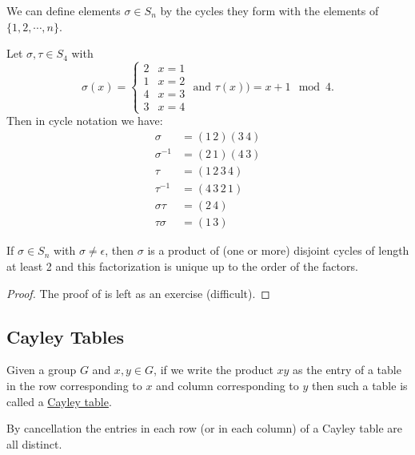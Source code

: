 \documentclass[11pt]{article}
\begin{document}
\begin{definition}
    We can define elements $\sigma\in S_n$ by the cycles they form with the elements of $\{1,2,\cdots,n\}$.
\end{definition}

\begin{example}
    Let $\sigma,\tau\in S_4$ with 
    \[\sigma(x)=\begin{cases}2&x=1\\1&x=2\\4&x=3\\3&x=4\end{cases}\text{ and }\tau(x))=x+1\mod{4}.\]
    Then in cycle notation we have:
    \begin{align*}
        \sigma&=(1\,2)(3\,4) \\
        \sigma^{-1}&=(2\,1)(4\,3) \\
        \tau&=(1\,2\,3\,4) \\
        \tau^{-1}&=(4\,3\,2\,1) \\
        \sigma\tau&=(2\,4) \\
        \tau\sigma&=(1\,3)
    \end{align*}
\end{example}

\begin{theorem}
    If $\sigma\in S_n$ with $\sigma\neq\epsilon$, then $\sigma$ is a product of (one or more) disjoint cycles of length at least 2 and this factorization is unique up to the order of the factors.
\end{theorem}

\begin{proof}
    The proof of  is left as an exercise (difficult).
\end{proof}

\subsection{Cayley Tables}

\begin{definition}
    Given a group $G$ and $x,y\in G$, if we write the product $xy$ as the entry of a table in the row corresponding to $x$ and column corresponding to $y$ then such a table is called a \ul{Cayley table}.
\end{definition}

\begin{note}
    By cancellation the entries in each row (or in each column) of a Cayley table are all distinct.
\end{note}
\end{document}

